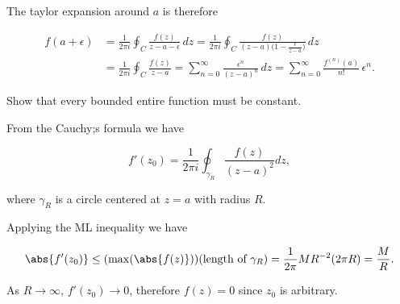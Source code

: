 \documentclass[english,a4paper,12pt]{report}
\begin{document}
The taylor expansion around \(a\) is therefore 

\begin{equation}
    \begin{aligned}
        f(a+\epsilon) &= \frac{1}{2\pi i}\oint_C \frac{f(z)}{z - a - \epsilon}\,dz = \frac{1}{2\pi i}\oint_C \frac{f(z)}{(z - a)\bigl(1 - \frac{\epsilon}{z-a}\bigr)}\,dz \\
&= \frac{1}{2\pi i}\oint_C \frac{f(z)}{z - a} = \sum_{n=0}^{\infty} \frac{\epsilon^n}{(z - a)^n}\,dz = \sum_{n=0}^{\infty} \frac{f^{(n)}(a)}{n!}\,\epsilon^n.
    \end{aligned}
\end{equation}

{Show that every bounded entire function must be constant.}
{From the Cauchy;s formula we have 

\begin{equation}
    f'(z_0 ) = \frac{1}{2\pi i} \oint_{\gamma _{R} } \frac{f(z)}{(z-a)^2} dz,   
\end{equation}

where \(\gamma _{R} \) is a circle centered at \(z = a\) with radius \(R\).

Applying the ML inequality we have 

\begin{equation}
    \abs{f'(z_0 )} \le (\max (\abs{f(z)} )) (\text{length of } \gamma _{R} ) = \frac{1}{2\pi } MR^{-2} (2\pi R) = \frac{M}{R}.   
\end{equation}

As \(R \to \infty\), \(f'(z_0 ) \to 0\), therefore \(f(z) = 0\) since \(z_0 \) is arbitrary.   
} 
\end{document}
